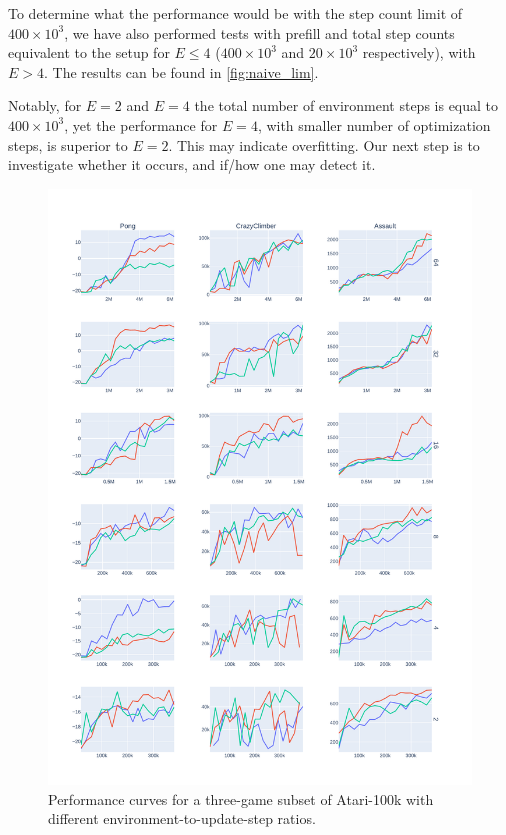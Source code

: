 \documentclass[twoside,11pt]{article}
\begin{document}
To determine what the performance would be with the step count limit of $400 \times 10^3$, we have also performed tests with prefill and total step counts equivalent to the setup for $E \leq 4$ ($400 \times 10^3$ and $20 \times 10^3$ respectively), with $E > 4$. The results can be found in \autoref{fig:naive_lim}.

Notably, for $E=2$ and $E=4$ the total number of environment steps is equal to $400 \times 10^3$, yet the performance for $E=4$, with smaller number of optimization steps, is superior to $E=2$. This may indicate overfitting. Our next step is to investigate whether it occurs, and if/how one may detect it.

\begin{figure}
  \centering
  \includegraphics[width=0.8\linewidth,height=0.8\paperheight,keepaspectratio]{assets/naive_perf.pdf}
  \caption{Performance curves for a three-game subset of Atari-100k with different environment-to-update-step ratios.}
  \label{fig:naive_perf}
\end{figure}

\vskip 0.2in

\end{document}
